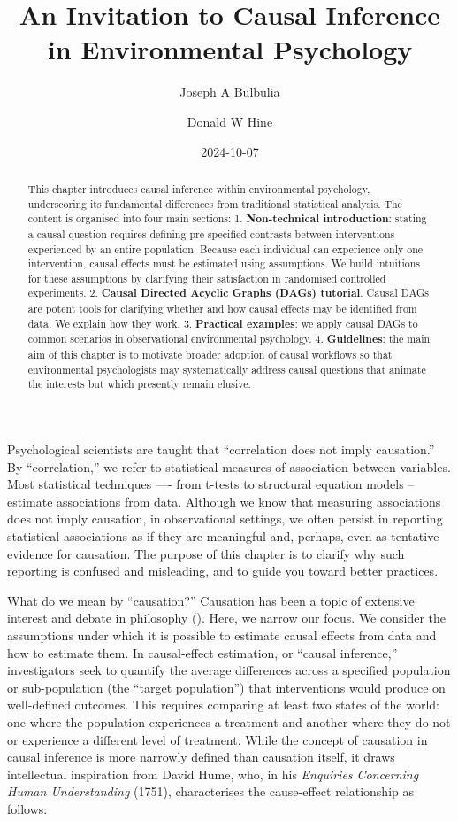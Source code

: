 \documentclass[
  singlecolumn]{article}
\title{An Invitation to Causal Inference in Environmental Psychology}
\author{Joseph A Bulbulia}
\affil{%
             \small{     Victoria University of Wellington, New Zealand,
School of Psychology, Centre for Applied Cross-Cultural Research
          ORCID \textcolor[HTML]{A6CE39}{\aiOrcid} ~0000-0002-5861-2056 }
              }
\author{Donald W Hine}
\affil{%
             \small{     University of Canterbury, School of Psychology,
Speech and Hearing
          ORCID \textcolor[HTML]{A6CE39}{\aiOrcid} ~0000-0002-3905-7026 }
              }
\date{2024-10-07}
\begin{document}
\maketitle
\begin{abstract}
This chapter introduces causal inference within environmental
psychology, underscoring its fundamental differences from traditional
statistical analysis. The content is organised into four main sections:
1. \textbf{Non-technical introduction}: stating a causal question
requires defining pre-specified contrasts between interventions
experienced by an entire population. Because each individual can
experience only one intervention, causal effects must be estimated using
assumptions. We build intuitions for these assumptions by clarifying
their satisfaction in randomised controlled experiments. 2.
\textbf{Causal Directed Acyclic Graphs (DAGs) tutorial}. Causal DAGs are
potent tools for clarifying whether and how causal effects may be
identified from data. We explain how they work. 3. \textbf{Practical
examples}: we apply causal DAGs to common scenarios in observational
environmental psychology. 4. \textbf{Guidelines}: the main aim of this
chapter is to motivate broader adoption of causal workflows so that
environmental psychologists may systematically address causal questions
that animate the interests but which presently remain elusive.
\end{abstract}

Psychological scientists are taught that ``correlation does not imply
causation.'' By ``correlation,'' we refer to statistical measures of
association between variables. Most statistical techniques ---- from
t-tests to structural equation models -- estimate associations from
data. Although we know that measuring associations does not imply
causation, in observational settings, we often persist in reporting
statistical associations as if they are meaningful and, perhaps, even as
tentative evidence for causation. The purpose of this chapter is to
clarify why such reporting is confused and misleading, and to guide you
toward better practices.

What do we mean by ``causation?'' Causation has been a topic of
extensive interest and debate in philosophy
(). Here, we narrow our focus. We
consider the assumptions under which it is possible to estimate causal
effects from data and how to estimate them. In causal-effect estimation,
or ``causal inference,'' investigators seek to quantify the average
differences across a specified population or sub-population (the
``target population'') that interventions would produce on well-defined
outcomes. This requires comparing at least two states of the world: one
where the population experiences a treatment and another where they do
not or experience a different level of treatment. While the concept of
causation in causal inference is more narrowly defined than causation
itself, it draws intellectual inspiration from David Hume, who, in his
\emph{Enquiries Concerning Human Understanding} (1751), characterises
the cause-effect relationship as follows:
\end{document}
